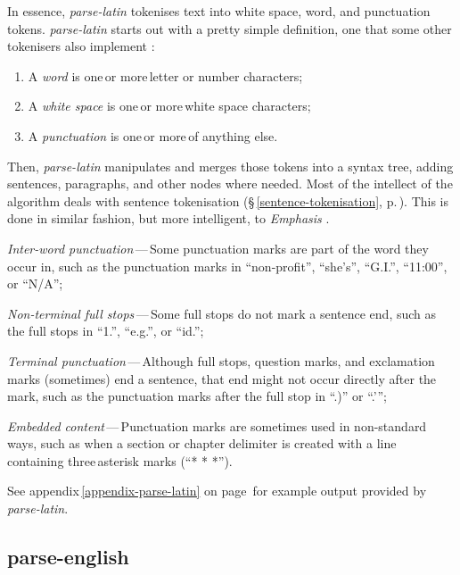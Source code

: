 In essence, \emph{parse-latin} tokenises text into white space, word, and
  punctuation tokens.
\emph{parse-latin} starts out with a pretty simple definition, one that
  some other tokenisers also implement \autocite{treebank-tokenisation}:

\begin{enumerate}
\item A \emph{word} is one\,or more\,letter or number characters;
\item A \emph{white space} is one\,or more\,white space characters;
\item A \emph{punctuation} is one\,or more\,of anything else.
\end{enumerate}

\noindent Then, \emph{parse-latin} manipulates and merges those tokens into a
  syntax tree, adding sentences, paragraphs, and other nodes where needed.
Most of the intellect of the algorithm deals with sentence tokenisation
  (§\,\ref{sentence-tokenisation}, p.\,\pageref{sentence-tokenisation}).
This is done in similar fashion, but more intelligent, to \emph{Emphasis}
  \autocite{nytimes/emphasis-source-code}.

\begin{aenumerate}
\item\emph{Inter-word punctuation}\,---\,Some punctuation marks are part of
  the word they occur in, such as the punctuation marks in ``non-profit'',
  ``she's'', ``G.I.'', ``11:00'', or ``N\slash A'';
\item\emph{Non-terminal full stops}\,---\,Some full stops do not mark a
  sentence end, such as the full stops in ``1.'', ``e.g.'', or ``id.'';
\item\emph{Terminal punctuation}\,---\,Although full stops, question marks,
  and exclamation marks (sometimes) end a sentence, that end might not occur
  directly after the mark, such as the punctuation marks after the full
  stop in ``.)'' or ``.'{}'';
\item\emph{Embedded content}\,---\,Punctuation marks are sometimes used in
  non-standard ways, such as when a section or chapter delimiter is
  created with a line containing three\,asterisk marks (``* * *'').
\end{aenumerate}

\noindent See appendix\,\ref{appendix-parse-latin} on
page\,\pageref{appendix-parse-latin} for example output provided
by \emph{parse-latin}.

\subsection{parse-english}\label{parse-english}

